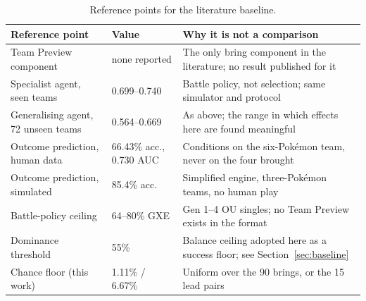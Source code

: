 \documentclass[conference]{IEEEtran}
\begin{document}
\begin{table}[!t]
\centering
\caption{Reference points for the literature baseline.}
\label{tab:baselinefigures}
\footnotesize
\setlength{\tabcolsep}{4pt}
\renewcommand{\arraystretch}{1.2}
\begin{tabular}{@{}p{2.5cm}p{1.5cm}p{3.4cm}@{}}
\toprule
\textbf{Reference point} & \textbf{Value} & \textbf{Why it is not a comparison} \\
\midrule
Team Preview component \cite{rodriguez2024} & none reported & The only bring component in the literature; no result published for it \\
\addlinespace
Specialist agent, seen teams \cite{angliss2026} & 0.699--0.740 & Battle policy, not selection; same simulator and protocol \\
\addlinespace
Generalising agent, 72 unseen teams \cite{angliss2026} & 0.564--0.669 & As above; the range in which effects here are found meaningful \\
\addlinespace
Outcome prediction, human data \cite{oblander2025} & 66.43\% acc., 0.730 AUC & Conditions on the six-Pok\'emon team, never on the four brought \\
\addlinespace
Outcome prediction, simulated \cite{reis2024} & 85.4\% acc. & Simplified engine, three-Pok\'emon teams, no human play \\
\addlinespace
Battle-policy ceiling \cite{grigsby2025} & 64--80\% GXE & Gen 1--4 OU singles; no Team Preview exists in the format \\
\addlinespace
Dominance threshold \cite{reis2021} & 55\% & Balance ceiling adopted here as a success floor; see Section~\ref{sec:baseline} \\
\addlinespace
Chance floor (this work) & 1.11\% / 6.67\% & Uniform over the 90 brings, or the 15 lead pairs \cite{angliss2026} \\
\bottomrule
\end{tabular}
\end{table}
\end{document}
